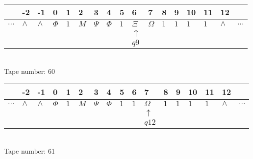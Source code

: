 \documentclass{article}
\begin{document}
\begin{table}[H]
\centering
\begin{tabular}{lllllllllllllllll}
 & -2 & -1 & 0 & 1 & 2 & 3 & 4 & 5 & 6 & 7 & 8 & 9 & 10 & 11 & 12 & \\
\hline
$...$ & \multicolumn{1}{|l|}{$\wedge$} & \multicolumn{1}{|l|}{$\wedge$} & \multicolumn{1}{|l|}{$\Phi$} & \multicolumn{1}{|l|}{$1$} & \multicolumn{1}{|l|}{$M$} & \multicolumn{1}{|l|}{$\Psi$} & \multicolumn{1}{|l|}{$\Phi$} & \multicolumn{1}{|l|}{$1$} & \multicolumn{1}{|l|}{$\Xi$} & \multicolumn{1}{|l|}{$\Omega$} & \multicolumn{1}{|l|}{$1$} & \multicolumn{1}{|l|}{$1$} & \multicolumn{1}{|l|}{$1$} & \multicolumn{1}{|l|}{$1$} & \multicolumn{1}{|l|}{$\wedge$} & $...$\\
\hline
&  &  &  &  &  &  &  &  & $\uparrow$ &  &  &  &  &  &  &  \\
&  &  &  &  &  &  &  &  & $ q9 $ &  &  &  &  &  &  &  \\
\end{tabular}
\\
Tape number: 60
\noindent\makebox[\linewidth]{\hdashrule{\textwidth}{1pt}{1pt}}\end{table}

\begin{table}[H]
\centering
\begin{tabular}{lllllllllllllllll}
 & -2 & -1 & 0 & 1 & 2 & 3 & 4 & 5 & 6 & 7 & 8 & 9 & 10 & 11 & 12 & \\
\hline
$...$ & \multicolumn{1}{|l|}{$\wedge$} & \multicolumn{1}{|l|}{$\wedge$} & \multicolumn{1}{|l|}{$\Phi$} & \multicolumn{1}{|l|}{$1$} & \multicolumn{1}{|l|}{$M$} & \multicolumn{1}{|l|}{$\Psi$} & \multicolumn{1}{|l|}{$\Phi$} & \multicolumn{1}{|l|}{$1$} & \multicolumn{1}{|l|}{$1$} & \multicolumn{1}{|l|}{$\Omega$} & \multicolumn{1}{|l|}{$1$} & \multicolumn{1}{|l|}{$1$} & \multicolumn{1}{|l|}{$1$} & \multicolumn{1}{|l|}{$1$} & \multicolumn{1}{|l|}{$\wedge$} & $...$\\
\hline
&  &  &  &  &  &  &  &  &  & $\uparrow$ &  &  &  &  &  &  \\
&  &  &  &  &  &  &  &  &  & $ q12 $ &  &  &  &  &  &  \\
\end{tabular}
\\
Tape number: 61
\noindent\makebox[\linewidth]{\hdashrule{\textwidth}{1pt}{1pt}}\end{table}
\end{document}
